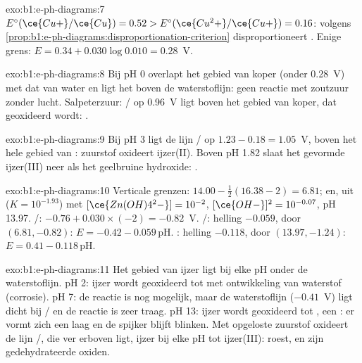 \begin{solution}{exo:b1:e-ph-diagrams:7}
$E^\circ(\ce{Cu+}/\ce{Cu}) = 0.52 > E^\circ(\ce{Cu^2+}/\ce{Cu+}) = 0.16$:
volgens \cref{prop:b1:e-ph-diagrams:disproportionation-criterion}
disproportioneert . Enige grens: $E = 0.34 + 0.030\log 0.010 =
0.28$~V.
\end{solution}

\begin{solution}{exo:b1:e-ph-diagrams:8}
Bij pH 0 overlapt het gebied van koper (onder 0.28~V) met dat van water
en ligt het boven de waterstoflijn: geen reactie met zoutzuur zonder
lucht. Salpeterzuur: / op 0.96~V ligt boven het gebied
van koper, dat geoxideerd wordt:
.
\end{solution}


\begin{solution}{exo:b1:e-ph-diagrams:9}
Bij pH 3 ligt de lijn / op $1.23 - 0.18 = 1.05$~V, boven
het hele gebied van : zuurstof oxideert ijzer(II). Boven pH
1.82 slaat het gevormde ijzer(III) neer als het geelbruine hydroxide:
.
\end{solution}

\begin{solution}{exo:b1:e-ph-diagrams:10}
Verticale grenzen: $14.00 - \frac12(16.38 - 2) = 6.81$; en, uit
 ($K = 10^{-1.93}$) met
$[\ce{Zn(OH)4^2-}] = 10^{-2}$, $[\ce{OH-}]^2 = 10^{-0.07}$, pH 13.97.
/: $-0.76 + 0.030 \times (-2) = -0.82$~V. /:
helling $-0.059$, door $(6.81, -0.82)$: $E = -0.42 - 0.059\,\mathrm{pH}$.
: helling $-0.118$, door
$(13.97, -1.24)$: $E = 0.41 - 0.118\,\mathrm{pH}$.
\end{solution}

\begin{solution}{exo:b1:e-ph-diagrams:11}
Het gebied van ijzer ligt bij elke pH onder de waterstoflijn. pH 2:
ijzer wordt geoxideerd tot  met ontwikkeling van waterstof
(corrosie). pH 7: de reactie is nog mogelijk, maar de waterstoflijn
($-0.41$~V) ligt dicht bij / en de reactie is zeer
traag. pH 13: ijzer wordt geoxideerd tot , een
: er vormt zich een laag en de spijker blijft blinken.
Met opgeloste zuurstof oxideert de lijn /, die ver erboven
ligt, ijzer bij elke pH tot ijzer(III): roest,  en zijn
gedehydrateerde oxiden.
\end{solution}

